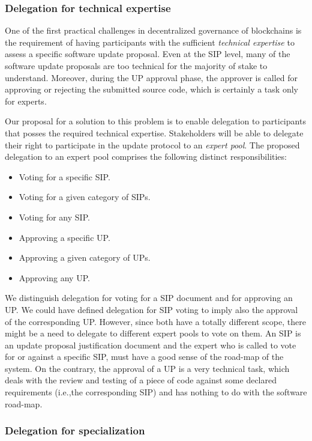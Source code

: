 \documentclass[11pt,a4paper]{article}
\begin{document}
\subsubsection{Delegation for technical expertise}
\label{sec:deleg-techn-expert}

One of the first practical challenges in decentralized governance of blockchains
is the requirement of having participants with the sufficient \emph{technical
  expertise} to assess a specific software update proposal.
%
Even at the SIP level, many of the software update proposals are too technical
for the majority of stake to understand.
%
Moreover, during the UP approval phase, the approver is called for approving or
rejecting the submitted source code, which is certainly a task only for experts.

Our proposal for a solution to this problem is to enable delegation to
participants that posses the required technical expertise.
%
Stakeholders will be able to delegate their right to participate in the update
protocol to an \emph{expert pool}. The proposed delegation to an expert pool
comprises the following distinct responsibilities:
\begin{itemize}
\item Voting for a specific SIP.
\item Voting for a given category of SIPs.
\item Voting for any SIP.
\item Approving a specific UP.
\item Approving a given category of UPs.
\item Approving any UP.
\end{itemize}
We distinguish delegation for voting for a SIP document and for approving an UP.
We could have defined delegation for SIP voting to imply also the approval of
the corresponding UP. However, since both have a totally different scope, there
might be a need to delegate to different expert pools to vote on them. An SIP is
an update proposal justification document and the expert who is called to vote
for or against a specific SIP, must have a good sense of the road-map of the
system. On the contrary, the approval of a UP is a very technical task, which
deals with the review and testing of a piece of code against some declared
requirements (i.e.,the corresponding SIP) and has nothing to do with the
software road-map.

\subsubsection{Delegation for specialization}
\label{sec:deleg-spec}
\end{document}
